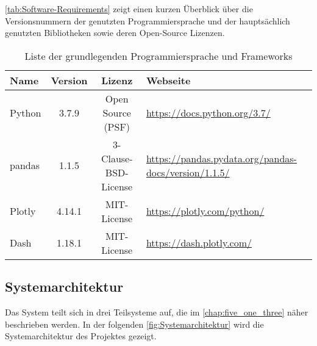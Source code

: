     \autoref{tab:Software-Requirements} zeigt einen kurzen Überblick über die Versionsnummern der genutzten Programmiersprache und der hauptsächlich 
    genutzten Bibliotheken sowie deren Open-Source Lizenzen.
    
    \begingroup
        \setlength{\tabcolsep}{4pt} %
        \renewcommand{\arraystretch}{1.5}
        \begin{table}[h]
            \centering
            \begin{adjustbox}{max width=\textwidth}
            \Huge
            \begin{tabular}{lccl}
               \toprule
               \textbf{Name}             &{Version}    &\textbf{Lizenz}                        & \textbf{Webseite}\\
               \midrule     
                    Python               &3.7.9         &Open Source (PSF)                     & \url{https://docs.python.org/3.7/}\\
                    pandas               &1.1.5         &3-Clause-BSD-License                  & \url{https://pandas.pydata.org/pandas-docs/version/1.1.5/}\\
                    Plotly               &4.14.1       &MIT-License                           & \url{https://plotly.com/python/}\\
                    Dash                 &1.18.1        &MIT-License                           & \url{https://dash.plotly.com/}\\


                \bottomrule
            \end{tabular}
            \end{adjustbox}
            \caption{%
                Liste der grundlegenden Programmiersprache und Frameworks
            \label{tab:Software-Requirements}
            }
             \end{table}
        \endgroup
    
     
    \subsection{Systemarchitektur}
    
    Das System teilt sich in drei Teilsysteme auf, die im \autoref{chap:five_one_three} näher beschrieben werden. 
    In der folgenden \autoref{fig:Systemarchitektur} wird die Systemarchitektur des Projektes gezeigt.

